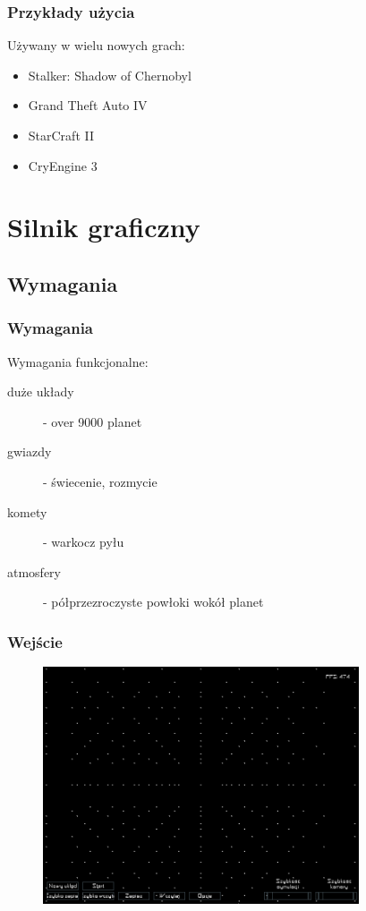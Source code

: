 \documentclass{beamer}
\begin{document}
\frame
{
	\frametitle{Przykłady użycia}

	Używany w wielu nowych grach:

	\begin{itemize}
	\item Stalker: Shadow of Chernobyl
	\item Grand Theft Auto IV
	\item StarCraft II
	\item CryEngine 3
	\end{itemize}
}

\section{Silnik graficzny}\label{sec:silnik graficzny}

\subsection{Wymagania}\label{sub:wymagania}

\frame
{
	\frametitle{Wymagania}

	Wymagania funkcjonalne:
	\begin{description}
	\item[duże układy] - over 9000 planet
	\item[gwiazdy] - świecenie, rozmycie
	\item[komety] - warkocz pyłu
	\item[atmosfery] - półprzezroczyste powłoki wokół planet
	\end{description}
}

\frame
{
	\frametitle{Wejście}
	\begin{figure}
	\centering
	\includegraphics[height=7cm]{img/r_points.png}
	\label{fig:deffered_rednering}
	\end{figure}
}
\end{document}
